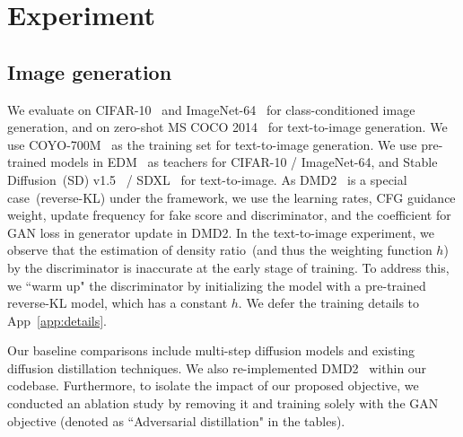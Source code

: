 
\section{Experiment}
\label{sec:experiment}




\subsection{Image generation}


We evaluate \methodtext on CIFAR-10~\citep{krizhevsky2009learning} and ImageNet-64~\citep{deng2009imagenet} for class-conditioned image generation, and on zero-shot MS COCO 2014~\cite{Lin2014MicrosoftCC} for text-to-image generation. We use COYO-700M~\cite{kakaobrain2022coyo-700m} as the training set for text-to-image generation. We use pre-trained models in EDM~\cite{Karras2022ElucidatingTD} as teachers for CIFAR-10 / ImageNet-64, and Stable Diffusion~(SD) v1.5~\cite{rombach2021highresolution} / SDXL~\cite{podell2024sdxl} for text-to-image. As DMD2~\cite{yin2024improved} is a special case~(reverse-KL) under the \methodtext framework, we use the learning rates, CFG guidance weight, update frequency for fake score and discriminator, and the coefficient for GAN loss in generator update in DMD2. 
In the text-to-image experiment, we observe that the estimation of density ratio~(and thus the weighting function $h$) by the discriminator is inaccurate at the early stage of training. To address this, we ``warm up" the discriminator by initializing the model with a pre-trained reverse-KL model, which has a constant $h$. We defer the training details to App~\ref{app:details}. %

Our baseline comparisons include multi-step diffusion models and existing diffusion distillation techniques. We also re-implemented DMD2~\cite{yin2024improved} within our codebase.  Furthermore, to isolate the impact of our proposed \methodtext objective, we conducted an ablation study by removing it and training solely with the GAN objective (denoted as ``Adversarial distillation" in the tables).

